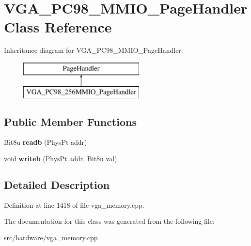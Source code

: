 \hypertarget{classVGA__PC98__256MMIO__PageHandler}{\section{V\-G\-A\-\_\-\-P\-C98\-\_\-M\-M\-I\-O\-\_\-\-Page\-Handler Class Reference}
\label{classVGA__PC98__256MMIO__PageHandler}
}
Inheritance diagram for V\-G\-A\-\_\-\-P\-C98\-\_\-M\-M\-I\-O\-\_\-\-Page\-Handler\-:\begin{figure}[H]
\begin{center}
\leavevmode
\includegraphics[height=2.000000cm]{classVGA__PC98__256MMIO__PageHandler}
\end{center}
\end{figure}
\subsection*{Public Member Functions}
\begin{DoxyCompactItemize}
\item 
\hypertarget{classVGA__PC98__256MMIO__PageHandler_a0d6629ec98ffef50737ec4209c81c579}{Bit8u {\bfseries readb} (Phys\-Pt addr)}\label{classVGA__PC98__256MMIO__PageHandler_a0d6629ec98ffef50737ec4209c81c579}

\item 
\hypertarget{classVGA__PC98__256MMIO__PageHandler_a18842c943f5e5f8edd481e1e6a1d8939}{void {\bfseries writeb} (Phys\-Pt addr, Bit8u val)}\label{classVGA__PC98__256MMIO__PageHandler_a18842c943f5e5f8edd481e1e6a1d8939}

\end{DoxyCompactItemize}


\subsection{Detailed Description}


Definition at line 1418 of file vga\-\_\-memory.\-cpp.



The documentation for this class was generated from the following file\-:\begin{DoxyCompactItemize}
\item 
src/hardware/vga\-\_\-memory.\-cpp\end{DoxyCompactItemize}
